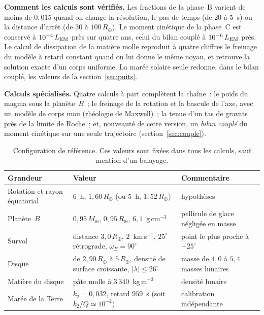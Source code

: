 \documentclass[11pt,a4paper]{article}
\newcommand{\Rt}{\ensuremath{R_\oplus}}
\newcommand{\Mt}{\ensuremath{M_\oplus}}
\newcommand{\LEM}{\ensuremath{L_{\rm EM}}}
\begin{document}
\textbf{Comment les calculs sont vérifiés.} Les fractions de la phase~B varient de moins de $0{,}015$ quand on change la résolution, le pas de temps (de $20$ à $5$~s) ou la distance d'arrêt (de $30$ à $100\,\Rt$). Le moment cinétique de la phase~C est conservé à $10^{-4}\,\LEM$ près sur quatre ans, celui du bilan couplé à $10^{-6}\,\LEM$ près. Le calcul de dissipation de la matière molle reproduit à quatre chiffres le freinage du modèle à retard constant quand on lui donne le même noyau, et retrouve la solution exacte d'un corps uniforme. La marée solaire seule redonne, dans le bilan couplé, les valeurs de la section~\ref{sec:puits}.

\textbf{Calculs spécialisés.} Quatre calculs à part complètent la chaîne~: le poids du magma sous la planète~$B$~; le freinage de la rotation et la bascule de l'axe, avec un modèle de corps mou (rhéologie de Maxwell)~; la tenue d'un tas de gravats près de la limite de Roche~; et, nouveauté de cette version, un \emph{bilan couplé} du moment cinétique sur une seule trajectoire (section~\ref{sec:couple}).

\begin{table}[htbp]
\centering
\caption{Configuration de référence. Ces valeurs sont fixées dans tous les calculs, sauf mention d'un balayage.\label{tab:config}}
\small
\begin{tabular}{>{\raggedright\arraybackslash}p{4.4cm}>{\raggedright\arraybackslash}p{5.6cm}>{\raggedright\arraybackslash}p{4.6cm}}
\toprule
Grandeur & Valeur & Commentaire \\
\midrule
Rotation et rayon équatorial & $6$~h, $1{,}60\,\Rt$ (ou $5$~h, $1{,}52\,\Rt$) & hypothèses \\
Planète~$B$ & $0{,}95\,\Mt$, $0{,}95\,\Rt$, $6{,}1$~g\,cm$^{-3}$ & pellicule de glace négligée en masse \\
Survol & distance $3{,}0\,\Rt$, $2$~km\,s$^{-1}$, $25^\circ$ rétrograde, $\omega_B=90^\circ$ & point le plus proche à $+25^\circ$ \\
Disque & de $2{,}90\,\Rt$ à $5\,\Rt$, densité de surface croissante, $|\lambda|\le26^\circ$ & masse de $4{,}0$ à $5{,}4$ masses lunaires \\
Matière du disque & pâte molle à $3\,340$~kg\,m$^{-3}$ & densité lunaire \\
Marée de la Terre & $k_2=0{,}032$, retard $959$~s (soit $k_2/Q\simeq10^{-2}$) & calibration indépendante \\
\bottomrule
\end{tabular}
\end{table}
\end{document}
